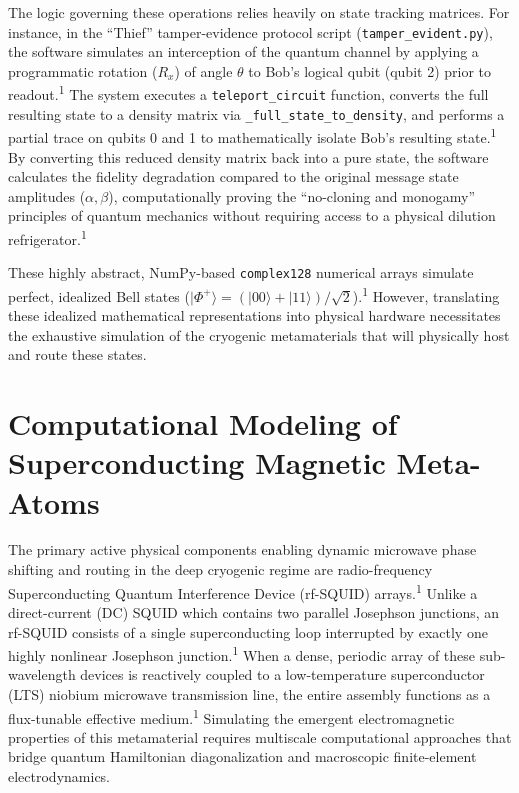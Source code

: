 \documentclass[11pt, a4paper]{article}
\begin{document}
The logic governing these operations relies heavily on state tracking matrices. For instance, in the ``Thief'' tamper-evidence protocol script (\texttt{tamper\_evident.py}), the software simulates an interception of the quantum channel by applying a programmatic rotation ($R_x$) of angle $\theta$ to Bob's logical qubit (qubit 2) prior to readout.\textsuperscript{1} The system executes a \texttt{teleport\_circuit} function, converts the full resulting state to a density matrix via \texttt{\_full\_state\_to\_density}, and performs a partial trace on qubits 0 and 1 to mathematically isolate Bob's resulting state.\textsuperscript{1} By converting this reduced density matrix back into a pure state, the software calculates the fidelity degradation compared to the original message state amplitudes ($\alpha, \beta$), computationally proving the ``no-cloning and monogamy'' principles of quantum mechanics without requiring access to a physical dilution refrigerator.\textsuperscript{1}

These highly abstract, NumPy-based \texttt{complex128} numerical arrays simulate perfect, idealized Bell states ($|\Phi^+\rangle = (|00\rangle + |11\rangle)/\sqrt{2}$).\textsuperscript{1} However, translating these idealized mathematical representations into physical hardware necessitates the exhaustive simulation of the cryogenic metamaterials that will physically host and route these states.

\section{Computational Modeling of Superconducting Magnetic Meta-Atoms}

The primary active physical components enabling dynamic microwave phase shifting and routing in the deep cryogenic regime are radio-frequency Superconducting Quantum Interference Device (rf-SQUID) arrays.\textsuperscript{1} Unlike a direct-current (DC) SQUID which contains two parallel Josephson junctions, an rf-SQUID consists of a single superconducting loop interrupted by exactly one highly nonlinear Josephson junction.\textsuperscript{1} When a dense, periodic array of these sub-wavelength devices is reactively coupled to a low-temperature superconductor (LTS) niobium microwave transmission line, the entire assembly functions as a flux-tunable effective medium.\textsuperscript{1} Simulating the emergent electromagnetic properties of this metamaterial requires multiscale computational approaches that bridge quantum Hamiltonian diagonalization and macroscopic finite-element electrodynamics.
\end{document}
